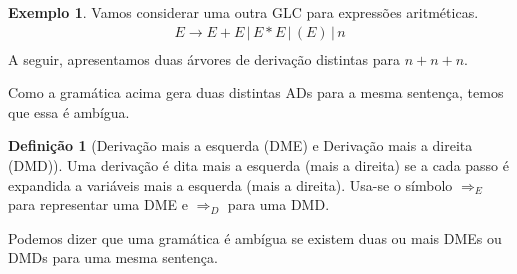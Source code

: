 \documentclass[a4paper]{article}
\theoremstyle{definition}
\newtheorem{Example}{Exemplo}
\newtheorem{Definition}{Definição}
\begin{document}
  \begin{Example}
    Vamos considerar uma outra GLC para expressões aritméticas.
    \[
      \begin{array}{l}
        E \to E + E\,|\,E * E\,|\,(E)\,|\,n\\
      \end{array}
    \]
    A seguir, apresentamos duas árvores de derivação distintas para
    $n + n + n$.
    \begin{figure}[H]
      \begin{minipage}{.45\textwidth}
      \end{minipage} \hfill
      \begin{minipage}{.45\textwidth}
      \end{minipage}
    \end{figure}
    Como a gramática acima gera duas distintas ADs para a mesma sentença, temos
    que essa é ambígua.
  \end{Example}

  \begin{Definition}[Derivação mais a esquerda (DME) e Derivação mais a direita
    (DMD)]
    Uma derivação é dita mais a esquerda (mais a direita) se a cada passo é
    expandida a variáveis mais a esquerda (mais a direita). Usa-se o símbolo
    $\Rightarrow_E$ para representar uma DME e $\Rightarrow_D$ para uma DMD.

    Podemos dizer que uma gramática é ambígua se existem duas ou mais DMEs ou
    DMDs para uma mesma sentença.
  \end{Definition}
\end{document}

